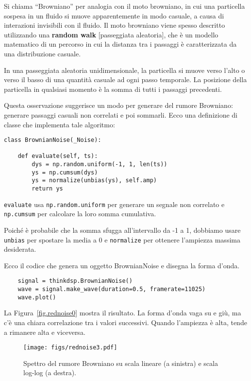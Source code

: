 \documentclass[12pt]{book} \usepackage[width=5.5in,height=8.5in, hmarginratio=3:2,vmarginratio=1:1]{geometry}
\begin{document}
Si chiama ``Browniano'' per analogia con il moto browniano, in cui una particella sospesa in un fluido si muove apparentemente in modo casuale, a causa di interazioni invisibili con il fluido. Il moto browniano viene spesso descritto utilizzando una {\bf random walk} [passeggiata aleatoria], che è un modello matematico di un percorso in cui la distanza tra i passaggi è caratterizzata da una distribuzione casuale.

In una passeggiata aleatoria unidimensionale, la particella si muove verso l'alto o verso il basso di una quantità casuale ad ogni passo temporale. La posizione della particella in qualsiasi momento è la somma di tutti i passaggi precedenti.

Questa osservazione suggerisce un modo per generare del rumore Browniano: generare passaggi casuali non correlati e poi sommarli. Ecco una definizione di classe che implementa tale algoritmo:

\begin{verbatim} 
class BrownianNoise(_Noise):

    def evaluate(self, ts):
        dys = np.random.uniform(-1, 1, len(ts))
        ys = np.cumsum(dys)
        ys = normalize(unbias(ys), self.amp)
        return ys
 \end{verbatim} 

{\tt evaluate} usa {\tt np.random.uniform} per generare un segnale non correlato e {\tt np.cumsum} per calcolare la loro somma cumulativa.

Poiché è probabile che la somma sfugga all'intervallo da -1 a 1, dobbiamo usare {\tt unbias} per spostare la media a 0 e {\tt normalize} per ottenere l'ampiezza massima desiderata.

Ecco il codice che genera un oggetto BrownianNoise e disegna la forma d'onda.

\begin{verbatim} 
    signal = thinkdsp.BrownianNoise()
    wave = signal.make_wave(duration=0.5, framerate=11025)
    wave.plot()
 \end{verbatim} 

La Figura~\ref{fig.rednoise0} mostra il risultato. La forma d'onda vaga su e giù, ma c'è una chiara correlazione tra i valori successivi. Quando l'ampiezza è alta, tende a rimanere alta e viceversa.

\begin{figure} 

\centerline{\texttt{[image: figs/rednoise3.pdf]}} \caption{Spettro del rumore Browniano su scala lineare (a sinistra) e scala log-log (a destra).} \label{fig.rednoise3} \end{figure} 
\end{document}
